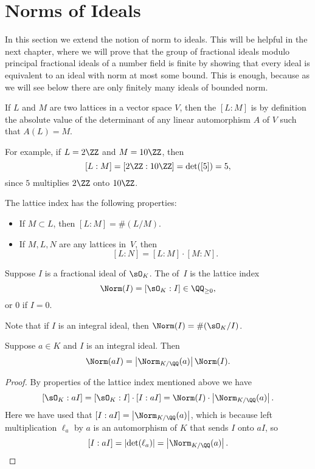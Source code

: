 \section{Norms of Ideals}
In this section we extend the notion of norm to ideals.  This will be
helpful in the next chapter, where
we will prove that the group of fractional ideals modulo principal
fractional ideals of a number field is finite by showing that every
ideal is equivalent to an ideal with norm at most some bound.
This is enough, because as we will see below there are only
finitely many ideals of bounded norm.
\begin{definition}
  If $L$ and $M$ are two lattices in a vector space $V$, then the
   $[L:M]$ is by definition the absolute value of the
  determinant of any linear automorphism $A$ of $V$ such that $A(L)=M$.
\end{definition}
For example, if $L=2\ZZ$ and $M=10\ZZ$, then
\[
  [L:M] = [2\ZZ : 10\ZZ] = \det([5]) = 5,
\]
since $5$ multiplies $2\ZZ$ onto $10\ZZ$.

The lattice index has the
following properties:
\begin{itemize}
  \item If $M\subset L$, then $[L:M]=\#(L/M)$.
  \item If $M, L, N$ are any lattices in~$V$, then
  \[
    [L:N] = [L:M]\cdot [M:N].
  \]
\end{itemize}


\begin{definition}
  Suppose $I$ is a fractional ideal of $\sO_K$.  The  of~$I$ is
  the lattice index
  \[
    \Norm(I) = [\sO_K : I] \in \QQ_{\geq 0},
  \]
  or $0$ if $I=0$.
\end{definition}
Note that if $I$ is an integral ideal, then $\Norm(I)=\#(\sO_K/I)$.

\begin{lemma}\label{lem:aIfrac}
  Suppose $a \in K$ and $I$ is an integral ideal.
  Then
  \[
    \Norm(a I) = \left|\Norm_{K/\QQ}(a)\right| \Norm(I).
  \]
\end{lemma}
\begin{proof}
  By properties of the lattice index mentioned above we have
  \[
    [\sO_K : aI] = [\sO_K : I] \cdot [I:aI]
    = \Norm(I) \cdot \left|\Norm_{K/\QQ}(a)\right|.
  \]
  Here we have used that $[I:aI]=\left|\Norm_{K/\QQ}(a)\right|$, which is because left
  multiplication $\ell_a$ by $a$ is an automorphism of $K$ that sends $I$ onto
  $aI$, so
  \[
    [I:aI]=\left|\det(\ell_a)\right|=\left|\Norm_{K/\QQ}(a)\right|.
  \]
\end{proof}

